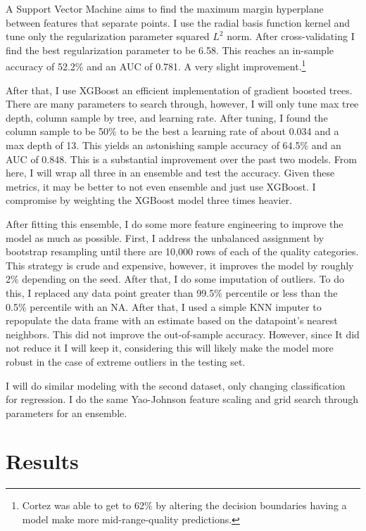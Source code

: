 \documentclass[16pt,twocolumn,letterpaper,titlepage]{article}
\begin{document}
A Support Vector Machine aims to find the maximum margin hyperplane between features that separate points. I use the radial basis function kernel and tune only the regularization parameter squared $L^2$ norm. After cross-validating I find the best regularization parameter to be 6.58. This reaches an in-sample accuracy of 52.2\% and an AUC of 0.781. A very slight improvement.\footnote{Cortez was able to get to 62\% by altering the decision boundaries having a model make more mid-range-quality predictions.}  

After that, I use XGBoost \cite{Chen2016} an efficient implementation of gradient boosted trees. There are many parameters to search through, however, I will only tune max tree depth, column sample by tree, and learning rate. After tuning, I found the column sample to be 50\% to be the best a learning rate of about 0.034 and a max depth of 13. This yields an astonishing sample accuracy of 64.5\% and an AUC of 0.848. This is a substantial improvement over the past two models. From here, I will wrap all three in an ensemble and test the accuracy. Given these metrics, it may be better to not even ensemble and just use XGBoost. I compromise by weighting the XGBoost model three times heavier. 

After fitting this ensemble, I do some more feature engineering to improve the model as much as possible. First, I address the unbalanced assignment by bootstrap resampling until there are 10,000 rows of each of the quality categories. This strategy is crude and expensive, however, it improves the model by roughly 2\% depending on the seed. After that, I do some imputation of outliers. To do this, I replaced any data point greater than 99.5\% percentile or less than the 0.5\% percentile with an NA. After that, I used a simple KNN imputer to repopulate the data frame with an estimate based on the datapoint's nearest neighbors. This did not improve the out-of-sample accuracy. However, since It did not reduce it I will keep it, considering this will likely make the model more robust in the case of extreme outliers in the testing set.

I will do similar modeling with the second dataset, only changing classification for regression. I do the same Yao-Johnson feature scaling and grid search through parameters for an ensemble. 


\section{Results}
\end{document}
